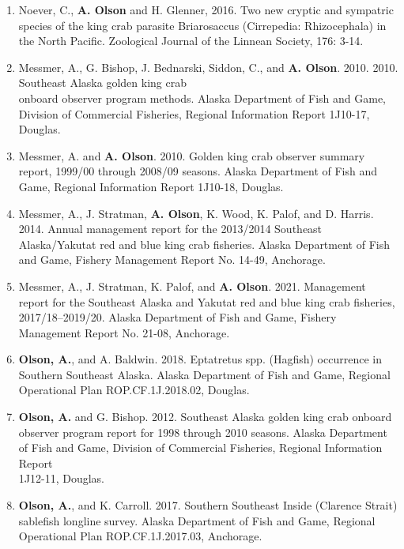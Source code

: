 \documentclass[10pt,a4paper,ragged2e]{altacv}
\begin{document}
\begin{fullwidth}
\begin{enumerate}
\vspace{0.15cm}
\item Noever, C., \textbf{A. Olson} and H. Glenner, 2016. Two new cryptic and sympatric species of the king crab parasite
Briarosaccus (Cirrepedia: Rhizocephala) in the North Pacific. Zoological Journal of the Linnean Society, 176:
3-14.
\vspace{0.15cm}
\item Messmer, A., G. Bishop, J. Bednarski, Siddon, C., and \textbf{A. Olson}. 2010. 2010. Southeast Alaska golden king crab \\onboard observer program methods. Alaska Department of Fish and Game, Division of Commercial Fisheries, Regional Information Report 1J10-17, Douglas.
\vspace{0.15cm}
\item Messmer, A. and \textbf{A. Olson}. 2010. Golden king crab observer summary report, 1999/00 through 2008/09 seasons. Alaska Department of Fish and Game, Regional Information Report 1J10-18, Douglas.
\vspace{0.15cm}
\item Messmer, A., J. Stratman, \textbf{A. Olson}, K. Wood, K. Palof, and D. Harris. 2014. Annual management report for the 2013/2014 Southeast Alaska/Yakutat red and blue king crab fisheries. Alaska Department of Fish and Game, Fishery Management Report No. 14-49, Anchorage.
\vspace{0.15cm}
\item Messmer, A., J. Stratman, K. Palof, and \textbf{A. Olson}. 2021. Management report for the Southeast Alaska and Yakutat red and blue king crab fisheries, 2017/18–2019/20. Alaska Department of Fish and Game, Fishery Management Report No. 21-08, Anchorage.
\vspace{0.15cm}
\item \textbf{Olson, A.}, and A. Baldwin. 2018. Eptatretus spp. (Hagfish) occurrence in Southern Southeast Alaska. Alaska Department of Fish and Game, Regional Operational Plan ROP.CF.1J.2018.02, Douglas. 
\vspace{0.15cm}
\item \textbf{Olson, A.} and G. Bishop. 2012. Southeast Alaska golden king crab onboard observer program report for 1998 through 2010 seasons. Alaska Department of Fish and Game, Division of Commercial Fisheries, Regional Information Report \\1J12-11, Douglas.
\vspace{0.15cm}
\item \textbf{Olson, A.}, and K. Carroll. 2017. Southern Southeast Inside (Clarence Strait) sablefish longline survey. Alaska Department of Fish and Game, Regional Operational Plan ROP.CF.1J.2017.03, Anchorage.

\end{enumerate}
\end{fullwidth}
\end{document}
